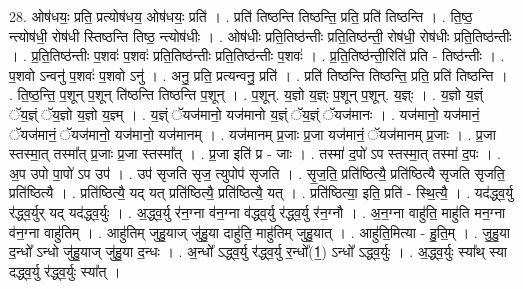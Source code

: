 \documentclass[17pt]{extarticle}
\begin{document}
28. ओष॑धयः॒ प्रति॒ प्रत्योष॑धय॒ ओष॑धयः॒ प्रति॑ । . प्रति॑ तिष्ठन्ति तिष्ठन्ति॒ प्रति॒ प्रति॑ तिष्ठन्ति । . ति॒ष्ठ॒ न्त्योष॑धी॒ रोष॑धी स्तिष्ठन्ति तिष्ठ॒ न्त्योष॑धीः । . ओष॑धीः प्रति॒तिष्ठ॑न्तीः प्रति॒तिष्ठ॑न्ती॒ रोष॑धी॒ रोष॑धीः प्रति॒तिष्ठ॑न्तीः । . प्र॒ति॒तिष्ठ॑न्तीः प॒शवः॑ प॒शवः॑ प्रति॒तिष्ठ॑न्तीः प्रति॒तिष्ठ॑न्तीः प॒शवः॑ । . प्र॒ति॒तिष्ठ॑न्ती॒रिति॑ प्रति - तिष्ठ॑न्तीः । . प॒शवो ऽन्वनु॑ प॒शवः॑ प॒शवो ऽनु॑ । . अनु॒ प्रति॒ प्रत्यन्वनु॒ प्रति॑ । . प्रति॑ तिष्ठन्ति तिष्ठन्ति॒ प्रति॒ प्रति॑ तिष्ठन्ति । . ति॒ष्ठ॒न्ति॒ प॒शून् प॒शून् ति॑ष्ठन्ति तिष्ठन्ति प॒शून् । . प॒शून्. य॒ज्ञो य॒ज्ञ्ः प॒शून् प॒शून्. य॒ज्ञ्ः । . य॒ज्ञो य॒ज्ञ्ं ॅय॒ज्ञ्ं ॅय॒ज्ञो य॒ज्ञो य॒ज्ञ्म् । . य॒ज्ञ्ं ॅयज॑मानो॒ यज॑मानो य॒ज्ञ्ं ॅय॒ज्ञ्ं ॅयज॑मानः । . यज॑मानो॒ यज॑मानं॒ ॅयज॑मानं॒ ॅयज॑मानो॒ यज॑मानो॒ यज॑मानम् । . यज॑मानम् प्र॒जाः प्र॒जा यज॑मानं॒ ॅयज॑मानम् प्र॒जाः । . प्र॒जा स्तस्मा॒त् तस्मा᳚त् प्र॒जाः प्र॒जा स्तस्मा᳚त् । . प्र॒जा इति॑ प्र - जाः । . तस्मा॑ द॒पो॑ ऽप स्तस्मा॒त् तस्मा॑ द॒पः । . अ॒प उपो पा॒पो॑ ऽप उप॑ । . उप॑ सृजति सृज॒ त्युपोप॑ सृजति । . सृ॒ज॒ति॒ प्रति॑ष्ठित्यै॒ प्रति॑ष्ठित्यै सृजति सृजति॒ प्रति॑ष्ठित्यै । . प्रति॑ष्ठित्यै॒ यद् यत् प्रति॑ष्ठित्यै॒ प्रति॑ष्ठित्यै॒ यत् । . प्रति॑ष्ठित्या॒ इति॒ प्रति॑ - स्थि॒त्यै॒ । . यद॑द्ध्व॒र्यु र॑द्ध्व॒र्युर् यद् यद॑द्ध्व॒र्युः । . अ॒द्ध्व॒र्यु र॑न॒ग्ना व॑न॒ग्ना व॑द्ध्व॒र्यु र॑द्ध्व॒र्यु र॑न॒ग्नौ । . अ॒न॒ग्ना वाहु॑ति॒ माहु॑ति मन॒ग्ना व॑न॒ग्ना वाहु॑तिम् । . आहु॑तिम् जुहु॒याज् जु॑हु॒या दाहु॑ति॒ माहु॑तिम् जुहु॒यात् । . आहु॑ति॒मित्या - हु॒ति॒म् । . जु॒हु॒या द॒न्धो᳚ ऽन्धो जु॑हु॒याज् जु॑हु॒या द॒न्धः । . अ॒न्धो᳚ ऽद्ध्व॒र्यु र॑द्ध्व॒र्यु र॒न्धो᳚(1॒) ऽन्धो᳚ ऽद्ध्व॒र्युः । . अ॒द्ध्व॒र्युः स्या᳚थ् स्या दद्ध्व॒र्यु र॑द्ध्व॒र्युः स्या᳚त् । \newline
\end{document}
